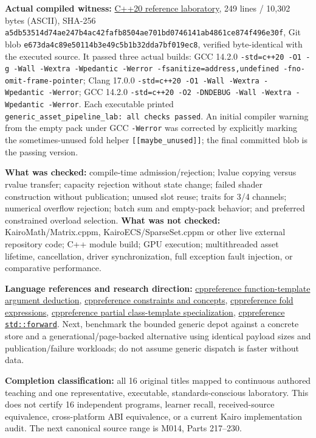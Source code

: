 \textbf{Actual compiled witness:} \href{tools/labs/generic_asset_pipeline_lab.cpp}{C++20 reference laboratory}, 249 lines / 10,302 bytes (ASCII), SHA-256 \texttt{a5db53514d74ae247b4ac42fafb8504ae701bd0746141ab4861ce874f496e30f}, Git blob \texttt{e673da4c89e50114b3e49c5b1b32dda7bf019ec8}, verified byte-identical with the executed source. It passed three actual builds: GCC 14.2.0 \texttt{-std=c++20\ -O1\ -g\ -Wall\ -Wextra\ -Wpedantic\ -Werror\ -fsanitize=address,undefined\ -fno-omit-frame-pointer}; Clang 17.0.0 \texttt{-std=c++20\ -O1\ -Wall\ -Wextra\ -Wpedantic\ -Werror}; GCC 14.2.0 \texttt{-std=c++20\ -O2\ -DNDEBUG\ -Wall\ -Wextra\ -Wpedantic\ -Werror}. Each executable printed \texttt{generic\_asset\_pipeline\_lab:\ all\ checks\ passed}. An initial compiler warning from the empty pack under GCC \texttt{-Werror} was corrected by explicitly marking the sometimes-unused fold helper \texttt{{[}{[}maybe\_unused{]}{]}}; the final committed blob is the passing version.

\textbf{What was checked:} compile-time admission/rejection; lvalue copying versus rvalue transfer; capacity rejection without state change; failed shader construction without publication; unused slot reuse; traits for 3/4 channels; numerical overflow rejection; batch sum and empty-pack behavior; and preferred constrained overload selection. \textbf{What was not checked:} KairoMath/Matrix.cppm, KairoECS/SparseSet.cppm or other live external repository code; C++ module build; GPU execution; multithreaded asset lifetime, cancellation, driver synchronization, full exception fault injection, or comparative performance.

\textbf{Language references and research direction:} \href{https://en.cppreference.com/w/cpp/language/template_argument_deduction}{cppreference function-template argument deduction}, \href{https://en.cppreference.com/w/cpp/language/constraints}{cppreference constraints and concepts}, \href{https://en.cppreference.com/w/cpp/language/fold}{cppreference fold expressions}, \href{https://en.cppreference.com/w/cpp/language/partial_specialization}{cppreference partial class-template specialization}, \href{https://en.cppreference.com/w/cpp/utility/forward}{cppreference \texttt{std::forward}}. Next, benchmark the bounded generic depot against a concrete store and a generational/page-backed alternative using identical payload sizes and publication/failure workloads; do not assume generic dispatch is faster without data.

\textbf{Completion classification:} all 16 original titles mapped to continuous authored teaching and one representative, executable, standards-conscious laboratory. This does not certify 16 independent programs, learner recall, received-source equivalence, cross-platform ABI equivalence, or a current Kairo implementation audit. The next canonical source range is M014, Parts 217--230.

